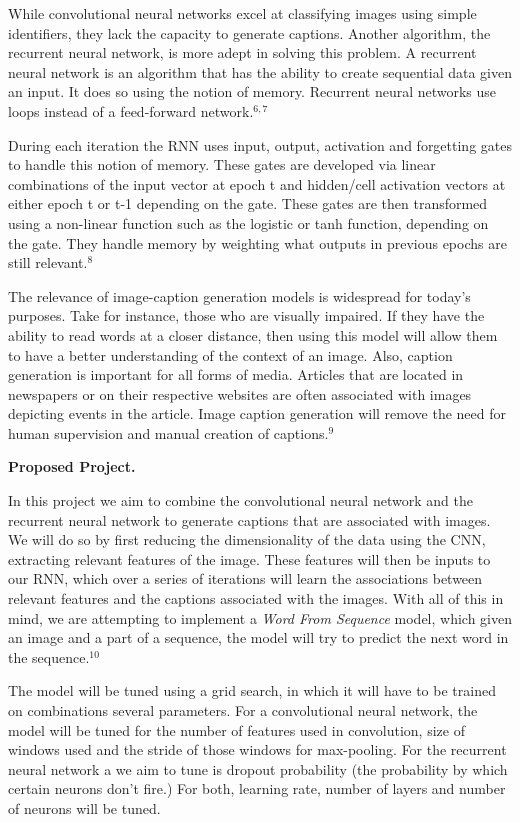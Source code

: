 \documentclass[10pt, oneside]{article}   	%
\begin{document}
While convolutional neural networks excel at classifying images using simple identifiers, they lack the capacity to generate captions. Another algorithm, the recurrent neural network, is more adept in solving this problem. A recurrent neural network is an algorithm that has the ability to create sequential data given an input. It does so using the notion of memory. Recurrent neural networks use loops instead of a feed-forward network.$^{6,7}$ 

During each iteration the RNN uses input, output, activation and forgetting gates to handle this notion of memory. These gates are developed via linear combinations of the input vector at epoch t and hidden/cell activation vectors at either epoch t or t-1 depending on the gate. These gates are then transformed using a non-linear function such as the logistic or tanh function, depending on the gate. They handle memory by weighting what outputs in previous epochs are still relevant.$^8$ 

The relevance of image-caption generation models is widespread for today's purposes. Take for instance, those who are visually impaired. If they have the ability to read words at a closer distance, then using this model will allow them to have a better understanding of the context of an image. Also, caption generation is important for all forms of media. Articles that are located in newspapers or on their respective websites are often associated with images depicting events in the article. Image caption generation will remove the need for human supervision and manual creation of captions.$^9$

\vspace{3mm}
\textbf{Proposed Project.}

In this project we aim to combine the convolutional neural network and the recurrent neural network to generate captions that are associated with images. We will do so by first reducing the dimensionality of the data using the CNN, extracting relevant features of the image. These features will then be inputs to our RNN, which over a series of iterations will learn the associations between relevant features and the captions associated with the images. With all of this in mind, we are attempting to implement a \textit{Word From Sequence} model, which given an image and a part of a sequence, the model will try to predict the next word in the sequence.$^{10}$

The model will be tuned using a grid search, in which it will have to be trained on combinations several parameters. For a convolutional neural network, the model will be tuned for the number of features used in convolution, size of windows used and the stride of those windows for max-pooling. For the recurrent neural network a we aim to tune is dropout probability (the probability by which certain neurons don't fire.) For both, learning rate, number of layers and number of neurons will be tuned.
\end{document}
